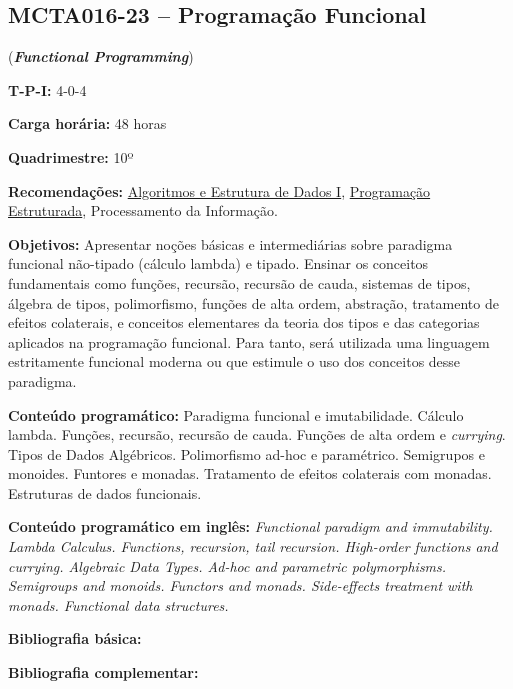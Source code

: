 \documentclass[class=article, crop=false]{standalone}
\begin{document}
\subsection*{MCTA016-23 -- Programação Funcional}
\label{disc:pf}

(\textbf{\textit{Functional Programming}})

\begin{center}
    \begin{minipage}{0.85\textwidth}
        \textbf{T-P-I:} 4-0-4
        
        \textbf{Carga horária:} 48 horas
        
        \textbf{Quadrimestre:} 10º
        
        \textbf{Recomendações:} 
        \hyperref[disc:aedI]{Algoritmos e Estrutura de Dados I},
        \hyperref[disc:pe]{Programação Estruturada},
        Processamento da Informação.
    \end{minipage}
\end{center}

\textbf{Objetivos:}
Apresentar noções básicas e intermediárias sobre paradigma funcional não-tipado
(cálculo lambda) e tipado. Ensinar os conceitos fundamentais como funções,
recursão, recursão de cauda, sistemas de tipos, álgebra de tipos, polimorfismo,
funções de alta ordem, abstração, tratamento de efeitos colaterais, e conceitos
elementares da teoria dos tipos e das categorias aplicados na programação
funcional. Para tanto, será utilizada uma linguagem estritamente funcional
moderna ou que estimule o uso dos conceitos desse paradigma.

\textbf{Conteúdo programático:}
Paradigma funcional e imutabilidade.
Cálculo lambda.
Funções, recursão, recursão de cauda.
Funções de alta ordem e \textit{currying}.
Tipos de Dados Algébricos.
Polimorfismo ad-hoc e paramétrico.
Semigrupos e monoides.
Funtores e monadas.
Tratamento de efeitos colaterais com monadas.
Estruturas de dados funcionais.

\textbf{Conteúdo programático em inglês:}
\textit{Functional paradigm and immutability.
Lambda Calculus.
Functions, recursion, tail recursion.
High-order functions and currying.
Algebraic Data Types.
Ad-hoc and parametric polymorphisms.
Semigroups and monoids.
Functors and monads.
Side-effects treatment with monads.
Functional data structures.}

\newrefsection
\textbf{Bibliografia básica:}
\nocite{1994-wadler-etal,1998-okasaki,2016-hutton}
\printbibliography

\newrefsection
\textbf{Bibliografia complementar:}
\nocite{2020-wadler,2009-dybvig,2009-sullivan-etal,2021-hickey-etal,2009-cesarini-etal}
\printbibliography
\end{document}

